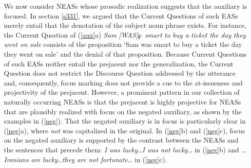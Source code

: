 \documentclass[11pt,fleqn]{article}
\newcommand{\foc}{$_{\mbox{\small F}}$}
\newcommand{\6}{\mbox{$[\hspace*{-.6mm}[$}}
\newcommand{\9}{\mbox{$]\hspace*{-.6mm}]$}}
\begin{document}
We now consider NEASs whose prosodic realization suggests that the auxiliary is focused. In section \ref{s331}, we argued that the Current Questions of such EASs merely entail that the denotation of the subject noun phrase exists. For instance, the Current Question of (\ref{aux}a) {\em Sam [WAS]\foc{} smart to buy a ticket the day they went on sale} consists of the proposition `Sam was smart to buy a ticket the day they went on sale' and the denial of that proposition. Because Current Questions of such EASs neither entail the prejacent nor the generalization, the Current Question does not restrict the Discourse Question addressed by the utterance and, consequently, focus marking does not provide a cue to the at-issueness and projectivity of the prejacent. However, a prominent pattern in our collection of naturally occurring NEASs is that the prejacent is highly projective for NEASs that are plausibly realized with focus on the negated auxiliary, as shown by the examples in (\ref{neg}). That the negated auxiliary is in focus is particularly clear in (\ref{neg}a), where {\em not} was capitalized in the original. In (\ref{neg}b) and (\ref{neg}c), focus on the negated auxiliary is supported by the contrast between the NEASs and the sentences that precede them: {\em I was lucky\ldots I was not lucky\ldots} in (\ref{neg}b) and {\em \ldots Iranians are lucky\ldots they are not fortunate\ldots} in (\ref{neg}c). 
\end{document}
